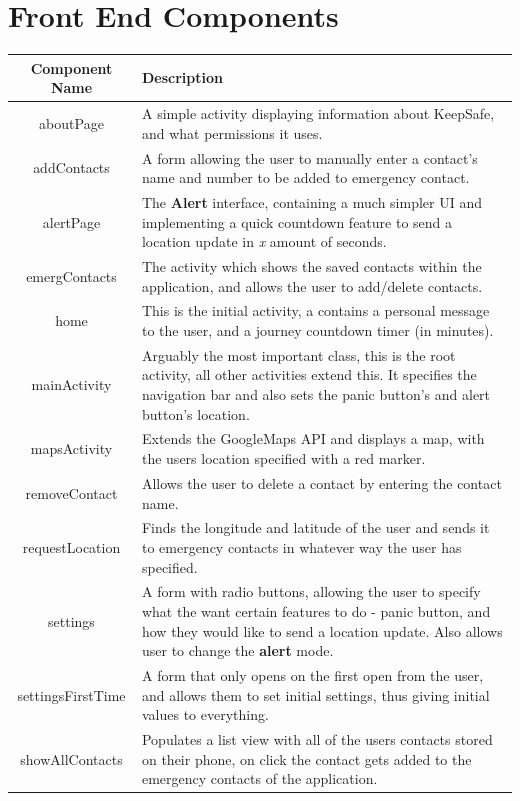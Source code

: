 \documentclass[a4paper]{report}
\begin{document}
\section{Front End Components}
	\begin{tabular} {|c|p{125mm}|}
		\hline
		Component Name & Description\\
		\hline 
		aboutPage & A simple activity displaying information about KeepSafe, and what permissions it uses. \\
		\hline
		addContacts & A form allowing the user to manually enter a contact's name and number to be added to emergency contact.\\
		\hline
		alertPage & The \textbf{Alert} interface, containing a much simpler UI and implementing a quick countdown feature to send a location update in \textit{x} amount of seconds.\\
		\hline
		emergContacts & The activity which shows the saved contacts within the application, and allows the user to add/delete contacts.\\
		\hline
		home & This is the initial activity, a contains a personal message to the user, and a journey countdown timer (in minutes). \\
		\hline
		mainActivity & Arguably the most important class, this is the root activity, all other activities extend this. It specifies the navigation bar and also sets the panic button's and alert button's location.\\
		\hline
		mapsActivity & Extends the GoogleMaps API and displays a map, with the users location specified with a red marker. \\
		\hline
		removeContact & Allows the user to delete a contact by entering the contact name.
	\\ \hline
		requestLocation & Finds the longitude and latitude of the user and sends it to emergency contacts in whatever way the user has specified. \\
		\hline 
		settings & A form with radio buttons, allowing the user to specify what the want certain features to do - panic button, and how they would like to send a location update. Also allows user to change the \textbf{alert} mode.
		\\ \hline
		settingsFirstTime & A form that only opens on the first open from the user, and allows them to set initial settings, thus giving initial values to everything. 
		\\ \hline 
		showAllContacts & Populates a list view with all of the users contacts stored on their phone, on click the contact gets added to the emergency contacts of the application. \\
		\hline
	\end{tabular}
\end{document}
